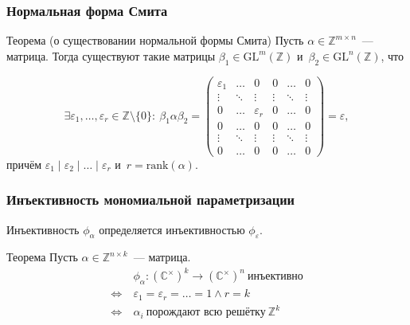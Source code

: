 \documentclass{beamer}
\newcommand{\Z}{\mathbb{Z}}
\newcommand{\GL}{\mathrm{GL}}
\newcommand{\divides}{\mid}
\begin{document}
\begin{frame}
  \frametitle{Нормальная форма Смита}

  \begin{block}{Теорема (о существовании нормальной формы Смита)}
      Пусть $\alpha \in \Z^{m \times n}$~— матрица.
      Тогда существуют такие матрицы $\beta_1 \in \GL^m(\Z)$
      и~$\beta_2 \in \GL^n(\Z)$, что

      $$
      \exists \varepsilon_1, \ldots, \varepsilon_r \in \Z \setminus \{0\}{:} \
      \beta_1 \alpha \beta_2 =
      \begin{pmatrix}
        \varepsilon_1 & \ldots & 0             & 0      & \ldots & 0      \\
               \vdots & \ddots & \vdots        & \vdots & \ddots & \vdots \\
                    0 & \ldots & \varepsilon_r & 0      & \ldots & 0      \\
                    0 & \ldots & 0             & 0      & \ldots & 0      \\
               \vdots & \ddots & \vdots        & \vdots & \ddots & \vdots \\
                    0 & \ldots & 0             & 0      & \ldots & 0
      \end{pmatrix} = \varepsilon,
      $$
      причём $\varepsilon_1 \divides \varepsilon_2 \divides \ldots \divides \varepsilon_r$ и~$r = \mathrm{rank}(\alpha)$.
  \end{block}
\end{frame}

\begin{frame}
  \frametitle{Инъективность мономиальной параметризации}

  Инъективность $\phi_\alpha$ определяется инъективностью $\phi_\varepsilon$.

  \begin{block}{Теорема}
    Пусть $\alpha \in \Z^{n \times k}$~— матрица.
    \begin{align*}
                     \ & \phi_\alpha : (\mathbb{C}^\times)^k \rightarrow (\mathbb{C}^\times)^n\ \text{инъективно} \\
      \Leftrightarrow\ & \varepsilon_1 = \varepsilon_r = \ldots = 1 \wedge r = k \\
      \Leftrightarrow\ & \alpha_i\ \text{порождают всю решётку}\ \Z^k
    \end{align*}
  \end{block}
\end{frame}
\end{document}
